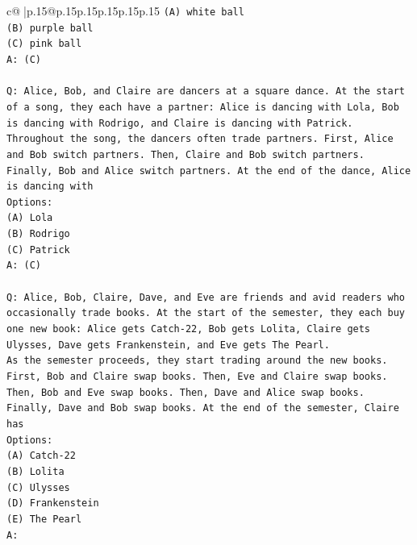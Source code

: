 \documentclass{article}
\begin{document}
{\begin{supertabular}{c@{$\;$}|p{.15\linewidth}@{}p{.15\linewidth}p{.15\linewidth}p{.15\linewidth}p{.15\linewidth}p{.15\linewidth}}
{{{\texttt{(A) white ball} \\
\texttt{(B) purple ball} \\
\texttt{(C) pink ball} \\
\texttt{A: (C)} \\
\\ 
\texttt{Q: Alice, Bob, and Claire are dancers at a square dance. At the start of a song, they each have a partner: Alice is dancing with Lola, Bob is dancing with Rodrigo, and Claire is dancing with Patrick.} \\
\texttt{Throughout the song, the dancers often trade partners. First, Alice and Bob switch partners. Then, Claire and Bob switch partners. Finally, Bob and Alice switch partners. At the end of the dance, Alice is dancing with} \\
\texttt{Options:} \\
\texttt{(A) Lola} \\
\texttt{(B) Rodrigo} \\
\texttt{(C) Patrick} \\
\texttt{A: (C)} \\
\\ 
\texttt{Q: Alice, Bob, Claire, Dave, and Eve are friends and avid readers who occasionally trade books. At the start of the semester, they each buy one new book: Alice gets Catch{-}22, Bob gets Lolita, Claire gets Ulysses, Dave gets Frankenstein, and Eve gets The Pearl.} \\
\texttt{As the semester proceeds, they start trading around the new books. First, Bob and Claire swap books. Then, Eve and Claire swap books. Then, Bob and Eve swap books. Then, Dave and Alice swap books. Finally, Dave and Bob swap books. At the end of the semester, Claire has} \\
\texttt{Options:} \\
\texttt{(A) Catch{-}22} \\
\texttt{(B) Lolita} \\
\texttt{(C) Ulysses} \\
\texttt{(D) Frankenstein} \\
\texttt{(E) The Pearl} \\
\texttt{A:} \\
            }
        }
    }
     \\ \\


\end{supertabular}}
\end{document}
